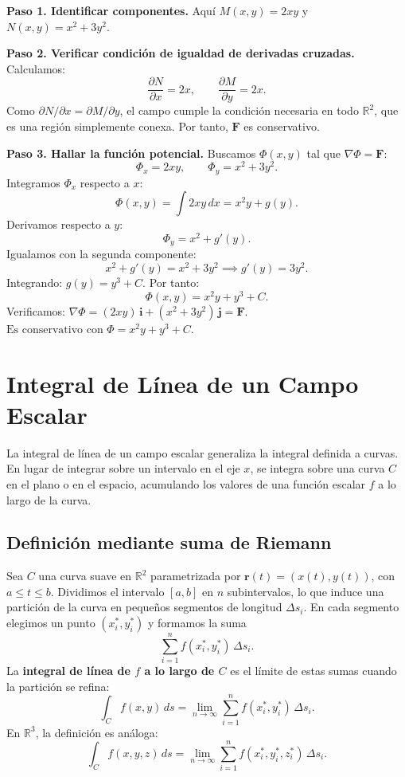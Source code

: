 \begin{myproof}
\textbf{Paso 1. Identificar componentes.}
Aquí \(M(x,y) = 2xy\) y \(N(x,y) = x^2 + 3y^2\).

\textbf{Paso 2. Verificar condición de igualdad de derivadas cruzadas.}
Calculamos:
\[
\frac{\partial N}{\partial x} = 2x, \qquad
\frac{\partial M}{\partial y} = 2x.
\]
Como \(\partial N/\partial x = \partial M/\partial y\), el campo
cumple la condición necesaria en todo \(\mathbb{R}^2\), que es una
región simplemente conexa. Por tanto, \(\mathbf{F}\) es conservativo.

\textbf{Paso 3. Hallar la función potencial.}
Buscamos \(\Phi(x,y)\) tal que \(\nabla \Phi = \mathbf{F}\):
\[
\Phi_x = 2xy, \qquad \Phi_y = x^2 + 3y^2.
\]
Integramos \(\Phi_x\) respecto a \(x\):
\[
\Phi(x,y) = \int 2xy \, dx = x^2 y + g(y).
\]
Derivamos respecto a \(y\):
\[
\Phi_y = x^2 + g'(y).
\]
Igualamos con la segunda componente:
\[
x^2 + g'(y) = x^2 + 3y^2 \implies g'(y) = 3y^2.
\]
Integrando: \(g(y) = y^3 + C\). Por tanto:
\[
\Phi(x,y) = x^2 y + y^3 + C.
\]
Verificamos: \(\nabla \Phi = (2xy)\,\mathbf{i} + (x^2+3y^2)\,\mathbf{j}
= \mathbf{F}\). \(\boxed{\text{Es conservativo con } \Phi = x^2 y + y^3 + C}\).
\end{myproof}

\section{Integral de Línea de un Campo Escalar}

La integral de línea de un campo escalar generaliza la integral
definida a curvas. En lugar de integrar sobre un intervalo en el eje
\(x\), se integra sobre una curva \(C\) en el plano o en el espacio,
acumulando los valores de una función escalar \(f\) a lo largo de la
curva.

\subsection*{Definición mediante suma de Riemann}

Sea \(C\) una curva suave en \(\mathbb{R}^2\) parametrizada por
\(\mathbf{r}(t) = (x(t), y(t))\), con \(a \le t \le b\). Dividimos
el intervalo \([a,b]\) en \(n\) subintervalos, lo que induce una
partición de la curva en pequeños segmentos de longitud \(\Delta s_i\).
En cada segmento elegimos un punto \((x_i^*, y_i^*)\) y formamos la
suma
\[
\sum_{i=1}^n f(x_i^*, y_i^*) \,\Delta s_i.
\]
La \textbf{integral de línea de \(f\) a lo largo de \(C\)} es el
límite de estas sumas cuando la partición se refina:
\[
\int_C f(x,y)\,ds = \lim_{n\to\infty}
\sum_{i=1}^n f(x_i^*, y_i^*) \,\Delta s_i.
\]
En \(\mathbb{R}^3\), la definición es análoga:
\[
\int_C f(x,y,z)\,ds = \lim_{n\to\infty}
\sum_{i=1}^n f(x_i^*, y_i^*, z_i^*) \,\Delta s_i.
\]

